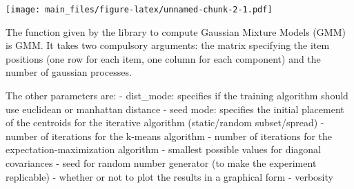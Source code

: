 \documentclass[
]{article}
\newenvironment{Shaded}{\begin{snugshade}}{\end{snugshade}}
\newcommand{\AttributeTok}[1]{\textcolor[rgb]{0.77,0.63,0.00}{#1}}
\newcommand{\DecValTok}[1]{\textcolor[rgb]{0.00,0.00,0.81}{#1}}
\newcommand{\FunctionTok}[1]{\textcolor[rgb]{0.00,0.00,0.00}{#1}}
\newcommand{\NormalTok}[1]{#1}
\newcommand{\SpecialCharTok}[1]{\textcolor[rgb]{0.00,0.00,0.00}{#1}}
\newcommand{\StringTok}[1]{\textcolor[rgb]{0.31,0.60,0.02}{#1}}
\begin{document}
\begin{Shaded}
\end{Shaded}

\texttt{[image: main\_files/figure-latex/unnamed-chunk-2-1.pdf]}

The function given by the library to compute Gaussian Mixture Models
(GMM) is GMM. It takes two compulsory arguments: the matrix specifying
the item positions (one row for each item, one column for each
component) and the number of gaussian processes.

The other parameters are: - dist\_mode: specifies if the training
algorithm should use euclidean or manhattan distance - seed mode:
specifies the initial placement of the centroids for the iterative
algorithm (static/random subset/spread) - number of iterations for the
k-means algorithm - number of iterations for the
expectation-maximization algorithm - smallest possible values for
diagonal covariances - seed for random number generator (to make the
experiment replicable) - whether or not to plot the results in a
graphical form - verbosity
\end{document}
